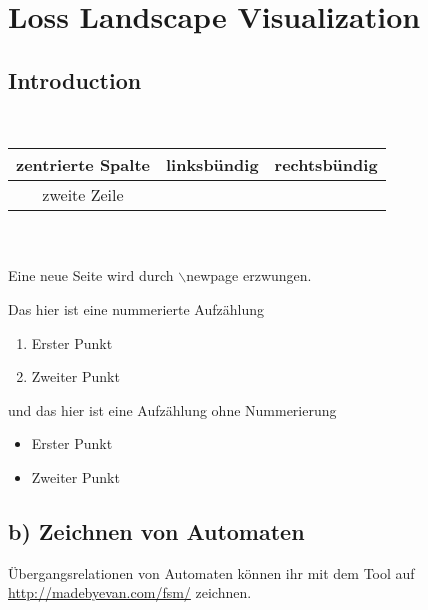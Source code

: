 \documentclass[a4paper]{scrartcl}
\begin{document}
	
	
	
	
	\section*{Loss Landscape Visualization}
	
	\subsection*{Introduction}

	\ \\ %
	\begin{tabular}{c|lr}
		zentrierte Spalte & linksbündig & rechtsbündig\\
		\hline
		zweite Zeile & \\
	\end{tabular}\\
	\ \\
	Eine neue Seite wird durch $\backslash$newpage erzwungen.
	\newpage
	
	Das hier ist eine nummerierte Aufzählung
	\begin{enumerate}
		\item Erster Punkt
		\item Zweiter Punkt
	\end{enumerate}
	
	und das hier ist eine Aufzählung ohne Nummerierung
	\begin{itemize}
		\item Erster Punkt
		\item Zweiter Punkt
	\end{itemize}
	
	\subsection*{b) Zeichnen von Automaten}
	
	Übergangsrelationen von Automaten können ihr mit dem Tool auf \url{http://madebyevan.com/fsm/} zeichnen. 
	
\end{document}
